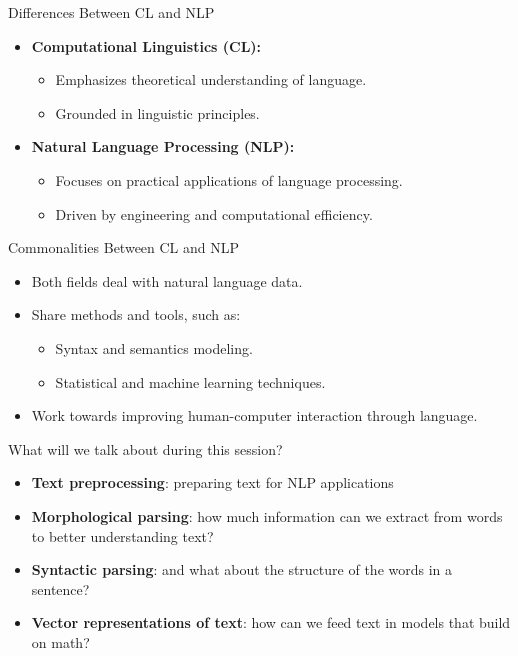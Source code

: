 \documentclass{beamer}
\begin{document}
\begin{frame}{Differences Between CL and NLP}
    \begin{itemize}
        \item \textbf{Computational Linguistics (CL):}
        \begin{itemize}
            \item Emphasizes theoretical understanding of language.
            \item Grounded in linguistic principles.
        \end{itemize}
        \item \textbf{Natural Language Processing (NLP):}
        \begin{itemize}
            \item Focuses on practical applications of language processing.
            \item Driven by engineering and computational efficiency.
        \end{itemize}
    \end{itemize}
\end{frame}

\begin{frame}{Commonalities Between CL and NLP}
    \begin{itemize}
        \item Both fields deal with natural language data.
        \item Share methods and tools, such as:
        \begin{itemize}
            \item Syntax and semantics modeling.
            \item Statistical and machine learning techniques.
        \end{itemize}
        \item Work towards improving human-computer interaction through language.
    \end{itemize}
\end{frame}


\begin{frame}{What will we talk about during this session?}
    \begin{itemize}
        \item \textbf{Text preprocessing}: preparing text for NLP applications
        \item \textbf{Morphological parsing}: how much information can we extract from words to better understanding text?
        \item \textbf{Syntactic parsing}: and what about the structure of the words in a sentence?
        \item \textbf{Vector representations of text}: how can we feed text in models that build on math?
    \end{itemize}
\end{frame}
\end{document}
